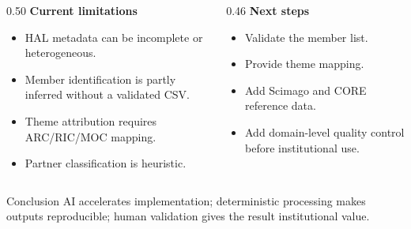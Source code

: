 \begin{frame}[t]

  \begin{columns}[T,onlytextwidth]
    \begin{column}{0.50\textwidth}
      \textbf{Current limitations}
      \begin{itemize}
        \item HAL metadata can be incomplete or heterogeneous.
        \item Member identification is partly inferred without a validated CSV.
        \item Theme attribution requires ARC/RIC/MOC mapping.
        \item Partner classification is heuristic.
      \end{itemize}
    \end{column}

    \begin{column}{0.46\textwidth}
      \textbf{Next steps}
      \begin{itemize}
        \item Validate the member list.
        \item Provide theme mapping.
        \item Add Scimago and CORE reference data.
        \item Add domain-level quality control before institutional use.
      \end{itemize}
    \end{column}
  \end{columns}

  \vspace{0.4cm}

  \begin{block}{Conclusion}
    AI accelerates implementation; deterministic processing makes outputs reproducible; human validation gives the result institutional value.
  \end{block}
\end{frame}

